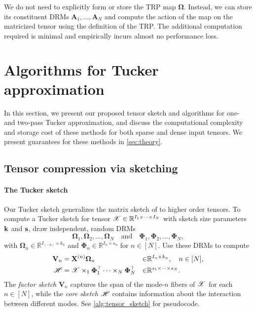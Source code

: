 We do not need to explicitly form or store the TRP map $\mathbf{\Omega}$.
Instead,
we can store its constituent DRMs $\mathbf{A}_1, \dots, \mathbf{A}_N$
and compute the action of the map on the matricized tensor
using the definition of the TRP.
The additional computation required is minimal and empirically incurs almost no performance loss.

\section{Algorithms for Tucker approximation}
In this section, we present our proposed tensor sketch and
algorithms for one- and two-pass Tucker approximation,
and discuss the computational complexity and storage cost of these methods
for both sparse and dense input tensors.
We present guarantees for these methods in \ref{sec:theory}.

\subsection{Tensor compression via sketching}\label{sec:sketch}

\paragraph{The Tucker sketch}
Our Tucker sketch generalizes the matrix sketch of \citet{tropp2018more} to higher order tensors.
To compute a Tucker sketch for tensor $\T{X} \in \reals^{I_1 \times \cdots \times I_N}$
with sketch size parameters $\mathbf{k}$ and $\mathbf{s}$,
draw independent, random DRMs
\begin{equation}\label{sketches}
\mathbf{\Omega}_1, \mathbf{\Omega}_2, \dots, \mathbf{\Omega}_N \quad \text{and} \quad \mathbf{\Phi}_1, \mathbf{\Phi}_2, \dots, \mathbf{\Phi}_N,
\end{equation}
with $\mathbf{\Omega}_n \in \mathbb{R}^{I_{(-n)} \times k_n}$ and
$\mathbf{\Phi}_n \in \mathbb{R}^{I_n \times s_n}$ for $n \in [N]$.
Use these DRMs to compute%
\begin{align*}
\label{eq:sketchy_matrix}
\M{V}_n  &= \M{X}^{(n)}\M{\Omega}_n &\in &\reals^{I_n \times k_n}, \quad n \in [N], \\
\T{H}    &= \T{X} \times_1 \M{\Phi}_1^\top \cdots \times_N \M{\Phi}_N^\top &\in &\reals^{s_1 \times \cdots \times s_N}.
\end{align*}
The \emph{factor sketch} $\mathbf{V}_n$
captures the span of the mode-$n$ fibers of $\T{X}$ for each $n \in [N]$,
while the \emph{core sketch} $\T{H}$ contains information about
the interaction between different modes.
See \ref{alg:tensor_sketch} for pseudocode.

